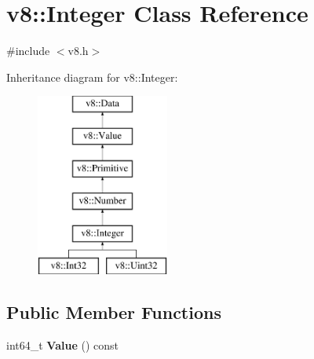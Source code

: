 \hypertarget{classv8_1_1_integer}{}\section{v8\+:\+:Integer Class Reference}
\label{classv8_1_1_integer}


{\ttfamily \#include $<$v8.\+h$>$}

Inheritance diagram for v8\+:\+:Integer\+:\begin{figure}[H]
\begin{center}
\leavevmode
\includegraphics[height=6.000000cm]{classv8_1_1_integer}
\end{center}
\end{figure}
\subsection*{Public Member Functions}
\begin{DoxyCompactItemize}
\item 
\hypertarget{classv8_1_1_integer_a93bcfb39090631a3ff95843463183c9c}{}int64\+\_\+t {\bfseries Value} () const \label{classv8_1_1_integer_a93bcfb39090631a3ff95843463183c9c}

\end{DoxyCompactItemize}
